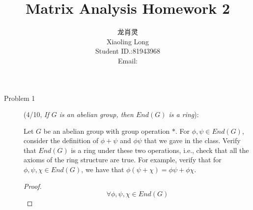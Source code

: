 \documentclass[a4paper]{article}
\title{Matrix Analysis Homework 2}
\author{龙肖灵 \\Xiaoling Long\\Student ID.:81943968\\Email:\email{longxl@shanghaitech.edu.cn}}
\begin{document}
\maketitle

\begin{description}
\item[Problem 1](4/10, \textit{If $G$ is an abelian group, then $End(G)$ is a ring}):

Let $G$ be an abelian group with group operation $*$. For $\phi,\psi \in End(G)$,
consider the definition of $\phi +\psi$ and $\phi\psi$ that we gave in the class.
Verify that $End(G)$ is a ring under these two operations, i.e.,
check that all the axioms of the ring structure are true. For example,
verify that for $\phi,\psi,\chi \in End(G)$, we have that $\phi(\psi+\chi)=\phi\psi+\phi\chi$.
\begin{proof}
      $$\forall \phi,\psi,\chi \in End(G)$$


\end{proof}
\end{description}
\end{document}
